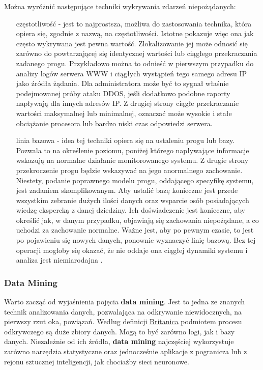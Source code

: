        Można wyróżnić następujące techniki wykrywania zdarzeń niepożądanych:
        \begin{itemize}
            \item[częstotliwość] - jest to najprostsza, możliwa do zastosowania technika, która opiera się,
            zgodnie z nazwą, na częstotliwości. Istotne pokazuje więc ona jak często wykrywana jest pewna wartość.
            Zlokalizowanie jej może odnosić się zarówno do powtarzającej się identycznej wartości lub ciągłego
            przekraczania zadanego progu. Przykładowo można to odnieść w pierwszym przypadku
            do analizy logów serwera WWW i ciągłych wystąpień tego samego adresu IP jako źródła żądania.
            Dla administratora może być to sygnał właśnie podejmowanej próby ataku DDOS, jeśli dodatkowo
            podobne raporty napływają dla innych adresów IP. Z drugiej strony ciągłe przekraczanie wartości
            maksymalnej lub minimalnej, oznaczać może wysokie i stałe obciążanie procesora lub bardzo
            niski czas odpowiedzi serwera. 
            \item[linia bazowa] - idea tej techniki opiera się na ustaleniu progu lub bazy. Pozwala to
            na określenie poziomu, poniżej którego napływające informacje wskazują na normalne działanie
            monitorowanego systemu. Z drugie strony przekroczenie progu będzie wskazywać na jego
            anormalnego zachowanie. Niestety, podanie poprawnego modelu progu, oddającego
            specyfikę systemu, jest zadaniem skomplikowanym. Aby ustalić bazę konieczne jest przede wszystkim
            zebranie dużych ilości danych oraz wsparcie osób posiadających wiedzę ekspercką z danej dziedziny.
            Ich doświadczenie jest konieczne, aby określić jak, w danym przypadku, objawiają się zachowania
            niepożądane, a co uchodzi za zachowanie normalne. Ważne jest, aby po pewnym czasie, to jest
            po pojawieniu się nowych danych, ponownie wyznaczyć linię bazową. Bez tej operacji mogłoby się okazać,
            że nie oddaje ona ciągłej dynamiki systemu i analiza jest niemiarodajna \cite{logging_log_management}.
        \end{itemize}
        
        \subsubsection{Data Mining}
        Warto zacząć od wyjaśnienia pojęcia \textbf{data mining}. Jest to jedna ze znanych technik analizowania
        danych, pozwalająca na odkrywanie niewidocznych, na pierwszy rzut oka, powiązań. Według definicji
        \href{http://www.britannica.com/technology/data-mining}{Britanica} podmiotem procesu odkrywczego są
        duże zbiory danych. Mogą to być zarówno logi, jak i bazy danych. Niezależnie od ich źródła, 
        \textbf{data mining} najczęściej wykorzystuje zarówno narzędzia statystyczne oraz jednocześnie aplikacje
        z pogranicza lub z rejonu sztucznej inteligencji, jak chociażby sieci neuronowe.
        
